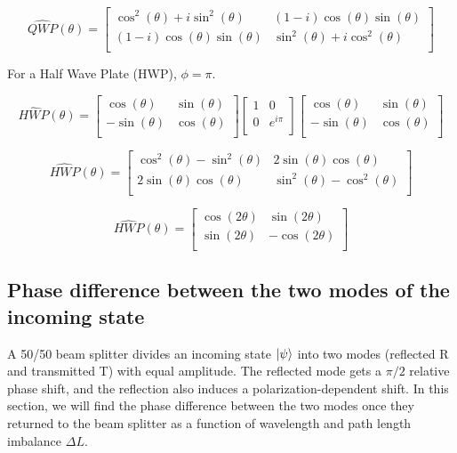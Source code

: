 \documentclass{article}
\begin{document}
\begin{equation}
\hat{QWP}(\theta) = \begin{bmatrix}
\cos^2(\theta)+i\sin^2(\theta)&(1-i)\cos(\theta)\sin(\theta)\\
(1-i)\cos(\theta)\sin(\theta)&\sin^2(\theta)+i\cos^2(\theta)\\
\end{bmatrix}
\end{equation}

{For a Half Wave Plate (HWP), $\phi = \pi$.}


\[\hat{HWP}(\theta) = \begin{bmatrix}
\cos(\theta)&\sin(\theta)\\
-\sin(\theta)&\cos(\theta)\\
\end{bmatrix}
\begin{bmatrix}
1&0\\
0&e^{i\pi}\\
\end{bmatrix}
\begin{bmatrix}
\cos(\theta)&\sin(\theta)\\
-\sin(\theta)&\cos(\theta)\\
\end{bmatrix}\]

\[\hat{HWP}(\theta) = \begin{bmatrix}
\cos^2(\theta)-\sin^2(\theta)&2\sin(\theta)\cos(\theta)\\
2\sin(\theta)\cos(\theta)&\sin^2(\theta)-\cos^2(\theta)\\
\end{bmatrix}
\]

\begin{equation}
\hat{HWP}(\theta) = \begin{bmatrix}
\cos(2\theta)&\sin(2\theta)\\
\sin(2\theta)&-\cos(2\theta)\\
\end{bmatrix}
\end{equation}


\subsection{Phase difference between the two modes of the incoming state}
\hspace{\parindent} A 50/50 beam splitter divides an incoming state $\ket{\psi}$ into two modes (reflected R and transmitted T) with equal amplitude. The reflected mode gets a $\pi/2$ relative phase shift, and the reflection also induces a polarization-dependent shift. In this section, we will find the phase difference between the two modes once they returned to the beam splitter as a function of wavelength and path length imbalance $\Delta{L}$.
\end{document}
